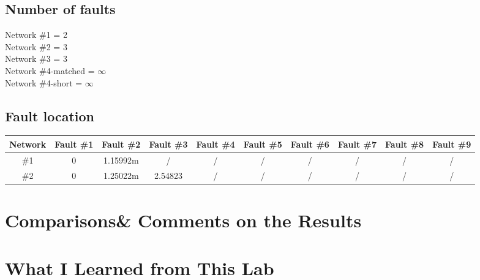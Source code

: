 \documentclass[11pt,oneside,a4paper]{report}
\begin{document}
\subsection*{Number of faults}
Network \#1 = 2\\
Network \#2 = 3\\
Network \#3 = 3\\
Network \#4-matched = \(\infty\)\\
Network \#4-short = \(\infty\)\\
\subsection*{Fault location}
\begin{table}[htbp]
\begin{tabular}{cccccccccc}
\toprule
Network & Fault \#1 & Fault \#2 & Fault \#3 & Fault \#4 & Fault \#5 & Fault \#6 & Fault \#7 & Fault \#8 & Fault \#9 \\
\midrule
\#1 & 0 & 1.15992m & / & / & / & / & / & / & / \\
\#2 & 0 & 1.25022m & 2.54823 & / & / & / & / & / & / \\
\bottomrule
\end{tabular}
\end{table}

\section*{Comparisons\& Comments on the Results}

\section*{What I Learned from This Lab}
\end{document}
